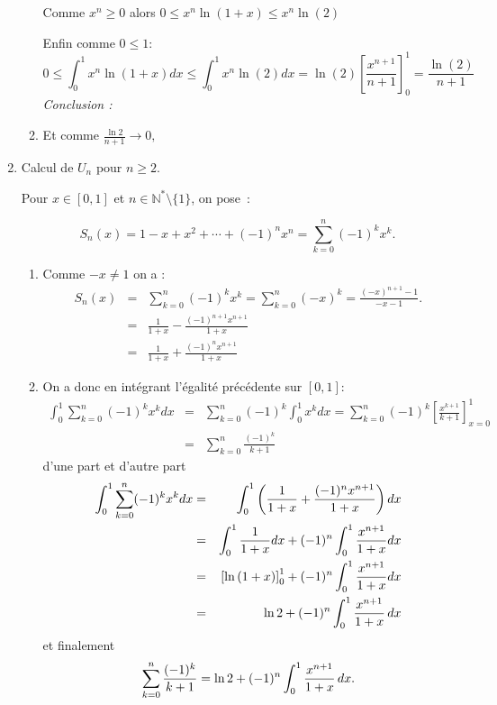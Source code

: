 \begin{correction}
\begin{enumerate}
\begin{enumerate}
Comme $x^{n}\ge 0$ alors $0\le x^{n}\ln \left( 1+x\right) \le x^{n}\ln
\left( 2\right) $

Enfin comme $0\le 1:$%
\begin{equation*}
0\le \int_{0}^{1}x^{n}\ln \left( 1+x\right) dx\le \int_{0}^{1}x^{n}\ln
\left( 2\right) dx=\ln \left( 2\right) \left[ \frac{x^{n+1}}{n+1}\right]
_{0}^{1}=\frac{\ln \left( 2\right) }{n+1}
\end{equation*}
\textsl{Conclusion : }

\item Et comme $\displaystyle
\frac{\ln 2}{n+1}\rightarrow 0,$ 
\end{enumerate}


\item Calcul de $U_n$ pour $n\geqslant 2$.

Pour $x\in [0,1]$ et $n\in \mathbb{N}^{*}\setminus \{1\}$, on pose~: 

\begin{equation*}
S_{n}(x)=1-x+x^{2}+\cdots +(-1)^{n}x^{n}=\sum_{k=0}^{n}(-1)^{k}x^{k}.
\end{equation*}
\begin{enumerate}
\item Comme $-x\ne 1$ on a : 
\begin{eqnarray*}
S_{n}(x) &=&\sum_{k=0}^{n}(-1)^{k}x^{k}=\sum_{k=0}^{n}(-x)^{k}=\frac{\left(
-x\right) ^{n+1}-1}{-x-1}. \\
&=&\frac{1}{1+x}-\frac{(-1)^{n+1}x^{n+1}}{1+x} \\
&=&\frac{1}{1+x}+\frac{(-1)^{n}x^{n+1}}{1+x}
\end{eqnarray*}

\item On a donc en int\'{e}grant l'\'{e}galit\'{e} pr\'{e}c\'{e}dente sur $%
\left[ 0,1\right] :$%
\begin{eqnarray*}
\int_{0}^{1}\sum_{k=0}^{n}(-1)^{k}x^{k}dx
&=&\sum_{k=0}^{n}(-1)^{k}\int_{0}^{1}x^{k}dx=\sum_{k=0}^{n}(-1)^{k}\left[ 
\frac{x^{k+1}}{k+1}\right] _{x=0}^{1} \\
&=&\sum_{k=0}^{n}\frac{(-1)^{k}}{k+1}
\end{eqnarray*}%
d'une part et d'autre part 
\begin{eqnarray*}
\int_{0}^{1}\sum_{k=0}^{n}(-1)^{k}x^{k}dx &=&\int_{0}^{1}\left( \frac{1}{1+x}%
+\frac{(-1)^{n}x^{n+1}}{1+x}\right) dx \\
&=&\int_{0}^{1}\frac{1}{1+x}dx+(-1)^{n}\int_{0}^{1}\frac{x^{n+1}}{1+x}dx \\
&=&\left[ \ln \left( 1+x\right) \right] _{0}^{1}+(-1)^{n}\int_{0}^{1}\frac{%
x^{n+1}}{1+x}dx \\
&=&\ln 2+(-1)^{n}\int_{0}^{1}\frac{x^{n+1}}{1+x}\,dx
\end{eqnarray*}%
et finalement 
\begin{equation*}
\sum_{k=0}^{n}\frac{(-1)^{k}}{k+1}=\ln 2+(-1)^{n}\int_{0}^{1}\frac{x^{n+1}}{%
1+x}\,dx.
\end{equation*}


\end{enumerate}
\end{enumerate}
\end{correction}
